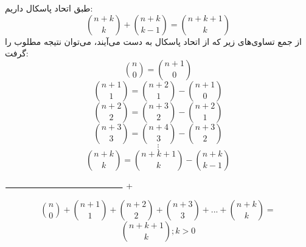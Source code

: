 \p
      طبق اتحاد پاسکال داریم:
     \[\binom{n+k}{k}+\binom{n+k}{k-1} = \binom{n+k+1}{k}\]
    از جمع تساوی‌های زیر که از اتحاد پاسکال به دست می‌آیند، می‌توان نتیجه مطلوب را گرفت:
    \[\binom{n}{0} = \binom{n+1}{0}\]
    \[\binom{n+1}{1} = \binom{n+2}{1}-\binom{n+1}{0}\]
    \[\binom{n+2}{2} = \binom{n+3}{2}-\binom{n+2}{1}\]
    \[\binom{n+3}{3} = \binom{n+4}{3}-\binom{n+3}{2}\]
    $$\vdots$$
    \[\binom{n+k}{k} = \binom{n+k+1}{k}-\binom{n+k}{k-1}\]
    \begin{center}
				$\rule{0.4\textwidth}{0.8pt}$
				\Huge{+}
	\end{center}
    $$\binom{n}{0}+\binom{n+1}{1}+\binom{n+2}{2}+\binom{n+3}{3}+...+\binom{n+k}{k} =$$
     $$\binom{n+k+1}{k}; k>0$$